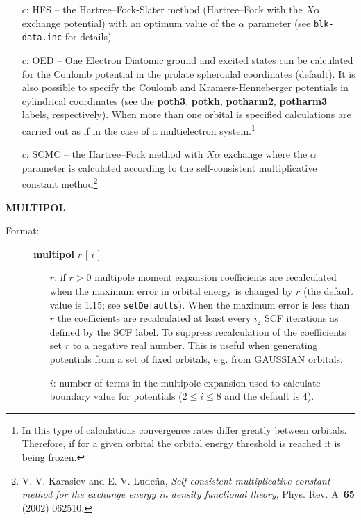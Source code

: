 \documentclass[12pt,a4paper]{article}
\newcommand{\ft}[1]{\texttt{#1}}
\newcommand{\fb}[1]{\textbf{#1}}
\begin{document}
\begin{description}
\begin{description}
\begin{itemize}
\item[$c$:] HFS -- the Hartree--Fock-Slater method (Hartree--Fock with the
  $X\alpha$ exchange potential) with an optimum value of the $\alpha$
  parameter (see \ft{blk-\-data.\-inc} for details)

\item[$c$:] OED -- One Electron Diatomic ground and excited states
  can be calculated for the Coulomb potential in the prolate
  spheroidal coordinates (default). It is also possible to specify
the Coulomb and Kramers-Henneberger potentials in cylindrical
coordinates (see the \fb{poth3}, \fb{potkh}, \fb{potharm2}, \fb{potharm3}  labels,
respectively). When more than one orbital is specified calculations
are carried out as if in the case of a multielectron
system.\footnote{In this type of calculations convergence rates differ
  greatly between orbitals. Therefore, if for a given orbital the
  orbital energy threshold is reached it is being frozen.}

\item[$c$:] SCMC -- the Hartree--Fock method with $X\alpha$ exchange
  where the $\alpha$ parameter is calculated according to the
  self-consistent multiplicative constant
  method\footnote{V. V. Karasiev and E. V. Lude\~{n}a,
    \textsl{Self-consistent multiplicative constant method for the
      exchange energy in density functional theory},
    Phys. Rev. A~\textbf{65} (2002)
    062510. }

\end{itemize}
\end{description}


\item \textbf{MULTIPOL}
\begin{description}
\item[Format:] \textbf{multipol} $r$ [ $i$ ]
\begin{itemize}
\item[$r$:] if $r>0$ multipole moment expansion coefficients are recalculated when the
  maximum error in orbital energy is changed by $r$ (the default value is 1.15; see
  \ft{setDefaults}). When the maximum error is less than $r$ the coefficients are
  recalculated at least every $i_2$ SCF iterations as defined by the SCF label. To
  suppress recalculation of the coefficients set $r$ to a negative real number. This is
  useful when generating potentials from a set of fixed orbitals, e.g. from GAUSSIAN
  orbitals.

\item[$i$:] number of terms in the multipole expansion used to calculate
  boundary value for potentials ($2 \le i\le 8$ and the default is 4).
\end{itemize}
\end{description}



\end{description}
\end{document}
